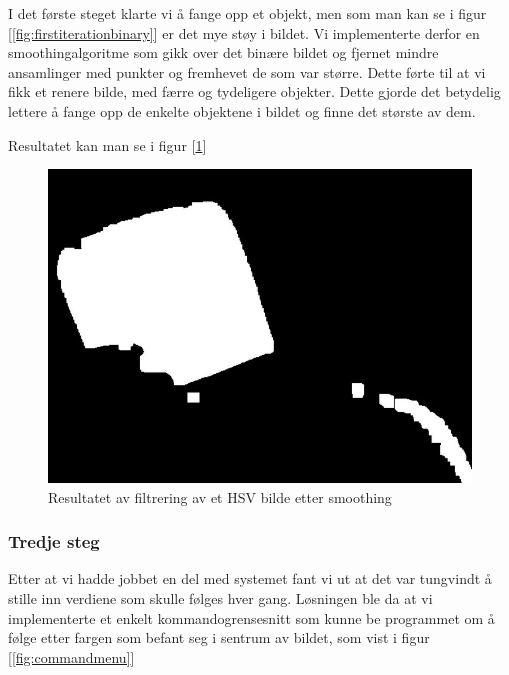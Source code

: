 I det første steget klarte vi å fange opp et objekt, men som man kan se i figur [\ref{fig:firstiterationbinary}] er det mye støy i bildet. Vi implementerte derfor en smoothingalgoritme som gikk over det binære bildet og fjernet mindre ansamlinger med punkter og fremhevet de som var større. Dette førte til at vi fikk et renere bilde, med færre og tydeligere objekter. Dette gjorde det betydelig lettere å fange opp de enkelte objektene i bildet og finne det største av dem.

Resultatet kan man se i figur [\ref{fig:seconditerationbinary}] 

\begin{figure}[h!]
	\centering
	\includegraphics[scale=0.45]{img/second-binary.jpg}
	\caption[Andre iterasjon binært bilde]{Resultatet av filtrering av et HSV bilde etter smoothing}
	\label{fig:seconditerationbinary}
\end{figure}

\subsubsection{Tredje steg}

Etter at vi hadde jobbet en del med systemet fant vi ut at det var tungvindt å stille inn verdiene som skulle følges hver gang. Løsningen ble da at vi implementerte et enkelt kommandogrensesnitt som kunne be programmet om å følge etter fargen som befant seg i sentrum av bildet, som vist i figur [\ref{fig:commandmenu}]

